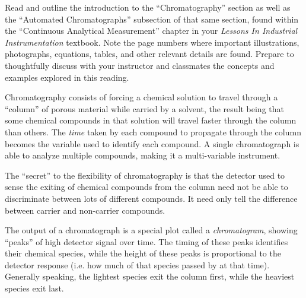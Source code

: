 
Read and outline the introduction to the ``Chromatography'' section as well as the ``Automated Chromatographs'' subsection of that same section, found within the ``Continuous Analytical Measurement'' chapter in your {\it Lessons In Industrial Instrumentation} textbook.  Note the page numbers where important illustrations, photographs, equations, tables, and other relevant details are found.  Prepare to thoughtfully discuss with your instructor and classmates the concepts and examples explored in this reading.













Chromatography consists of forcing a chemical solution to travel through a ``column'' of porous material while carried by a solvent, the result being that some chemical compounds in that solution will travel faster through the column than others.  The {\it time} taken by each compound to propagate through the column becomes the variable used to identify each compound.  A single chromatograph is able to analyze multiple compounds, making it a multi-variable instrument.

\vskip 10pt

The ``secret'' to the flexibility of chromatography is that the detector used to sense the exiting of chemical compounds from the column need not be able to discriminate between lots of different compounds.  It need only tell the difference between carrier and non-carrier compounds.

\vskip 10pt

The output of a chromatograph is a special plot called a {\it chromatogram}, showing ``peaks'' of high detector signal over time.  The timing of these peaks identifies their chemical species, while the height of these peaks is proportional to the detector response (i.e. how much of that species passed by at that time).  Generally speaking, the lightest species exit the column first, while the heaviest species exit last.





